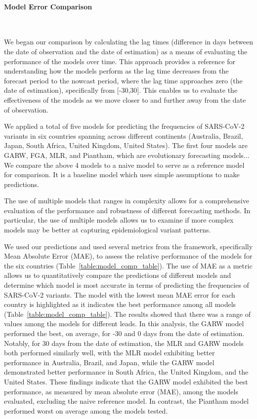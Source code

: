\documentclass[11pt,oneside,letterpaper]{article}
\begin{document}
\paragraph{Model Error Comparison}\

We began our comparison by calculating the lag times (difference in days between the date of observation and the date of estimation) as a means of evaluating the performance of the models over time.
This approach provides a reference for understanding how the models perform as the lag time decreases from the forecast period to the nowcast period, where the lag time approaches zero (the date of estimation), specifically from [-30,30].
This enables us to evaluate the effectiveness of the models as we move closer to and further away from the date of observation.

We applied a total of five models for predicting the frequencies of SARS-CoV-2 variants in six countries spanning across different continents (Australia, Brazil, Japan, South Africa, United Kingdom, United States).
The first four models are GARW, FGA, MLR, and Piantham, which are evolutionary forecasting models... %
We compare the above 4 models to a naive model to serve as a reference model for comparison.
It is a baseline model which uses simple assumptions to make predictions. %

The use of multiple models that ranges in complexity allows for a comprehensive evaluation of the performance and robustness of different forecasting methods.
In particular, the use of multiple models allows us to examine if more complex models may be better at capturing epidemiological variant patterns. 

We used our predictions and used several metrics from the framework, specifically Mean Absolute Error (MAE), to assess the relative performance of the models for the six countries (Table~\ref{table:model_comp_table}).
The use of MAE as a metric allows us to quantitatively compare the predictions of different models and determine which model is most accurate in terms of predicting the frequencies of SARS-CoV-2 variants.
The model with the lowest mean MAE error for each country is highlighted as it indicates the best performance among all models (Table~\ref{table:model_comp_table}). 
The results showed that there was a range of values among the models for different leads.
In this analysis, the GARW model performed the best, on average, for -30 and 0 days from the date of estimation.
Notably, for 30 days from the date of estimation, the MLR and GARW models both performed similarly well, with the MLR model exhibiting better performance in Australia, Brazil, and Japan, while the GARW model demonstrated better performance in South Africa, the United Kingdom, and the United States.
These findings indicate that the GARW model exhibited the best performance, as measured by mean absolute error (MAE), among the models evaluated, excluding the naive reference model.
In contrast, the Piantham model performed worst on average among the models tested.
\end{document}
